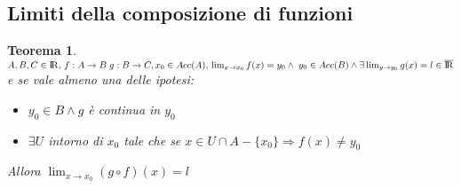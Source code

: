 \documentclass[12pt, a4paper]{article}
\theoremstyle{break}
\newtheorem{theorem}{Teorema}[subsection]
\newcommand\R{{\rm I\!R}}
\newcommand{\Lim}[3]{\lim_{#1} #2 = #3}
\newcommand{\func}[3]{#1:#2\rightarrow #3}
\begin{document}
    \subsection{Limiti della composizione di funzioni}
    \begin{theorem}
        $A,B,C\in\R ,\, \func{f}{A}{B}\;\func{g}{B}{C}, x_0\in Acc(A),\, \Lim{x\to x_0}{f(x)}{y_0} \wedge\; y_0\in Acc(B) \wedge \exists \Lim{y\to y_0}{g(x)}{l}\in\overline{\R}$ e se vale almeno una delle ipotesi:
        \begin{itemize}
            \item $y_0\in B \wedge g$ è continua in $y_0$
            \item $\exists U$ intorno di $x_0$ tale che se $x\in U\cap A-\{x_0\}\Rightarrow f(x)\neq y_0$ 
        \end{itemize}
        Allora $\Lim{x\to x_0}{(g\circ f)(x)}{l}$
    \end{theorem}
\end{document}
